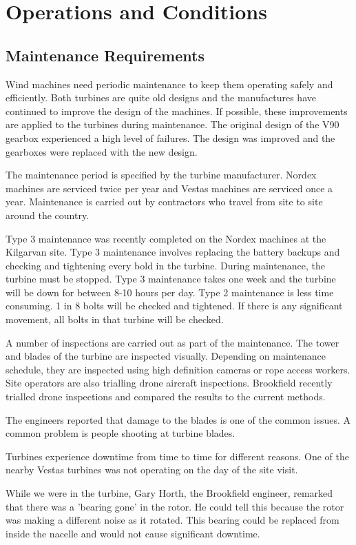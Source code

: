 \documentclass[12pt]{article} %
\begin{document}
\section{Operations and Conditions}

\subsection{Maintenance Requirements}
Wind machines need periodic maintenance to keep them operating safely and efficiently. 
Both turbines are quite old designs and the manufactures have continued to improve the design of the machines. If possible, these improvements are applied to the turbines during maintenance.
The original design of the V90 gearbox experienced a high level of failures. The design was improved and the gearboxes were replaced with the new design.

The maintenance period is specified by the turbine manufacturer.
Nordex machines are serviced twice per year and Vestas machines are serviced once a year. 
Maintenance is carried out by contractors who travel from site to site around the country.

Type 3 maintenance was recently completed on the Nordex machines at the Kilgarvan site. Type 3 maintenance involves replacing the battery backups and checking and tightening every bold in the turbine. During maintenance, the turbine must be stopped. Type 3 maintenance takes one week and the turbine will be down for between 8-10 hours per day.
Type 2 maintenance is less time consuming. 1 in 8 bolts will be checked and tightened. If there is any significant movement, all bolts in that turbine will be checked.

A number of inspections are carried out as part of the maintenance. The tower and blades of the turbine are inspected visually. Depending on maintenance schedule, they are inspected using high definition cameras or rope access workers. Site operators are also trialling drone aircraft inspections. Brookfield recently trialled drone inspections and compared the results to the current methods.

The engineers reported that damage to the blades is one of the common issues. A common problem is people shooting at turbine blades.

Turbines experience downtime from time to time for different reasons. One of the nearby Vestas turbines was not operating on the day of the site visit.

While we were in the turbine, Gary Horth, the Brookfield engineer, remarked that there was a 'bearing gone' in the rotor. He could tell this because the rotor was making a different noise as it rotated. This bearing could be replaced from inside the nacelle and would not cause significant downtime.
\end{document}
